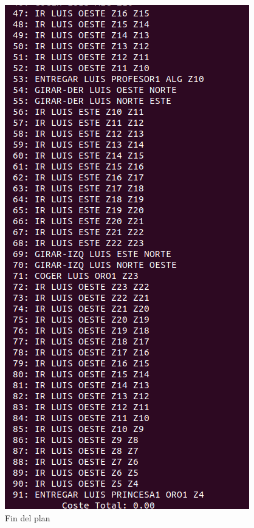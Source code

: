 \begin{figure}[H]
	\begin{minipage}[b]{0.5\linewidth}
		\centering
		\includegraphics[width=\linewidth]{ej4-2.png}
		\caption{Fin del plan}
		\label{fig:ej4-2}
	\end{minipage}
\end{figure}

